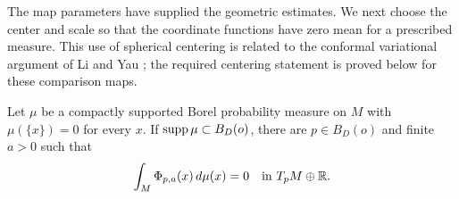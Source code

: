 The map parameters have supplied the geometric estimates. We next
choose the center and scale so that the coordinate functions have zero
mean for a prescribed measure. This use of spherical centering is
related to the conformal variational argument of Li and Yau
\cite[pp.~274--275]{LiYau1982}; the required centering statement is
proved below for these comparison maps.

\begin{lemma}\label{lem:balancing}
Let $\mu$ be a compactly supported Borel probability measure on $M$
with $\mu(\{x\})=0$ for every $x$. If $\operatorname{supp}\mu\subset B_D(o)$,
there are $p\in B_D(o)$ and finite $a>0$ such that
\begin{equation}\label{eq:balanced-map}
 \int_M\Phi_{p,a}(x)\,d\mu(x)=0\quad\text{in }T_pM\oplus\mathbb R.
\end{equation}
\end{lemma}

